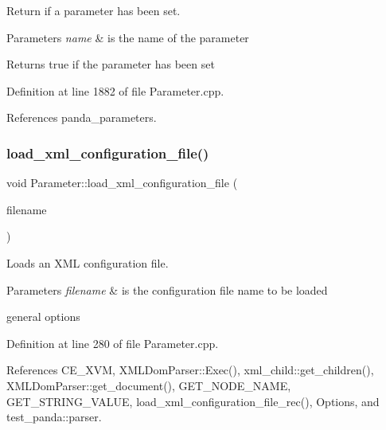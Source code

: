 Return if a parameter has been set. 


\begin{DoxyParams}{Parameters}
{\em name} & is the name of the parameter \\
\hline
\end{DoxyParams}
\begin{DoxyReturn}{Returns}
true if the parameter has been set 
\end{DoxyReturn}


Definition at line 1882 of file Parameter.\+cpp.



References panda\+\_\+parameters.

\mbox{\label{classParameter_a7e7dfa3795e73f61f5f4ff92732f58c2}} 
\subsubsection{\texorpdfstring{load\+\_\+xml\+\_\+configuration\+\_\+file()}{load\_xml\_configuration\_file()}}
{\footnotesize\ttfamily void Parameter\+::load\+\_\+xml\+\_\+configuration\+\_\+file (\begin{DoxyParamCaption}\item[{const std\+::string \&}]{filename }\end{DoxyParamCaption})}



Loads an X\+ML configuration file. 


\begin{DoxyParams}{Parameters}
{\em filename} & is the configuration file name to be loaded \\
\hline
\end{DoxyParams}
general options 

Definition at line 280 of file Parameter.\+cpp.



References C\+E\+\_\+\+X\+VM, X\+M\+L\+Dom\+Parser\+::\+Exec(), xml\+\_\+child\+::get\+\_\+children(), X\+M\+L\+Dom\+Parser\+::get\+\_\+document(), G\+E\+T\+\_\+\+N\+O\+D\+E\+\_\+\+N\+A\+ME, G\+E\+T\+\_\+\+S\+T\+R\+I\+N\+G\+\_\+\+V\+A\+L\+UE, load\+\_\+xml\+\_\+configuration\+\_\+file\+\_\+rec(), Options, and test\+\_\+panda\+::parser.



